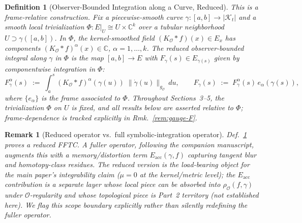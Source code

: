 \documentclass[11pt]{article}
\newtheorem{definition}{Definition}
\newtheorem{remark}{Remark}
\newcommand{\Kt}{\mathcal{K}_t}
\newcommand{\Obs}{\mathcal{O}}
\newcommand{\resO}{\rho_{\Obs}}
\newcommand{\gO}{g_{\Obs}}
\newcommand{\KO}{K_{\Obs}}
\newcommand{\mask}{\mu}
\newcommand{\EE}{E}
\begin{document}
\begin{definition}[Observer-Bounded Integration along a Curve, Reduced]
\label{def:int}
\emph{This is a frame-relative construction.} Fix a piecewise-smooth
curve $\gamma: [a, b] \to |\Kt|$ and a smooth local trivialization
$\Phi: \EE|_U \cong U \times \mathbb{C}^k$ over a tubular
neighborhood $U \supset \gamma([a, b])$. In $\Phi$, the
kernel-smoothed field $(\KO * f)(x) \in \EE_x$ has components
$(\KO * f)^\alpha(x) \in \mathbb{C}$, $\alpha = 1, \ldots, k$. The
\emph{reduced observer-bounded integral along $\gamma$ in $\Phi$} is
the map $[a, b] \to \EE$ with $F_\gamma(s) \in \EE_{\gamma(s)}$ given
by componentwise integration in $\Phi$:
\[
F_\gamma^\alpha(s) \;:=\; \int_a^s (\KO * f)^\alpha(\gamma(u))\; \|\dot\gamma(u)\|_{\gO}\, du,
\qquad F_\gamma(s) \;:=\; F_\gamma^\alpha(s)\, e_\alpha(\gamma(s)),
\]
where $\{e_\alpha\}$ is the frame associated to $\Phi$. Throughout
Sections~3--5, the trivialization $\Phi$ on $U$ is fixed, and all
results below are asserted relative to $\Phi$; frame-dependence is
tracked explicitly in Rmk.~\ref{rem:gauge-F}.
\end{definition}

\begin{remark}[Reduced operator vs.\ full symbolic-integration operator]
\label{rem:reduced}
Def.~\ref{def:int} proves a \emph{reduced} FFTC. A fuller operator,
following the companion manuscript, augments this with a
memory\slash distortion term $E_{\mathrm{acc}}(\gamma, f)$ capturing tangent
blur and homotopy-class residues. The \emph{reduced} version is the
load-bearing object for the main paper's integrability claim
($\mask = 0$ at the kernel/metric level); the $E_{\mathrm{acc}}$
contribution is a separate layer whose local piece can be absorbed
into $\resO(f, \gamma)$ under $\Obs$-regularity and whose topological
piece is Part~2 territory (not established here). We flag this scope
boundary explicitly rather than silently redefining the fuller
operator.
\end{remark}
\end{document}
